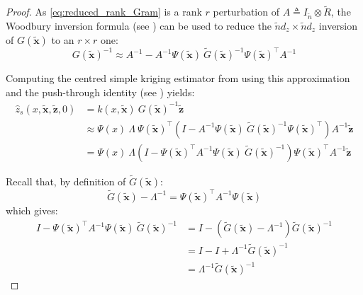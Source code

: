 \begin{proof}
	As \eqref{eq:reduced_rank_Gram} is a rank $r$ perturbation of $A\triangleq I_{\tilde{n}}\otimes\tilde{R}$, the Woodbury inversion formula (see ) can be used to reduce the $\tilde{n}d_z\times\tilde{n}d_z$ inversion of $G(\tilde{\mathbf{x}})$ to an $r\times r$ one:
	\begin{equation}
		G(\tilde{\mathbf{x}})^{-1}\approx A^{-1}-A^{-1}\Psi(\tilde{\mathbf{x}})\:\tilde{G}(\tilde{\mathbf{x}})^{-1}\Psi(\tilde{\mathbf{x}})^\top A^{-1}
	\end{equation}

	Computing the centred simple kriging estimator from  using this approximation and the push-through identity (see ) yields:
	\begin{equation}
		\begin{aligned}
		\hat{z}_s(x,\tilde{\mathbf{x}},\tilde{\mathbf{z}},0)&=k(x,\tilde{\mathbf{x}})\:G(\tilde{\mathbf{x}})^{-1}\tilde{\mathbf{z}}\\
		&\approx\Psi(x)\:\Lambda\:\Psi(\tilde{\mathbf{x}})^\top\left(I-A^{-1}\Psi(\tilde{\mathbf{x}})\:\tilde{G}(\tilde{\mathbf{x}})^{-1}\Psi(\tilde{\mathbf{x}})^\top\right)A^{-1}\tilde{\mathbf{z}}\\
		&=\Psi(x)\:\Lambda\left(I-\Psi(\tilde{\mathbf{x}})^\top A^{-1}\Psi(\tilde{\mathbf{x}})\:\tilde{G}(\tilde{\mathbf{x}})^{-1}\right)\Psi(\tilde{\mathbf{x}})^\top A^{-1}\tilde{\mathbf{z}}
		\end{aligned}\label{eq:z_s_up_to_tilde_G}
	\end{equation}

	Recall that, by definition of $\tilde{G}(\tilde{\mathbf{x}})$:
	\begin{equation}
		\tilde{G}(\tilde{\mathbf{x}})-\Lambda^{-1}=\Psi(\tilde{\mathbf{x}})^\top A^{-1}\Psi(\tilde{\mathbf{x}})
	\end{equation}
	which gives:
	\begin{equation}
		\begin{aligned}
		I-\Psi(\tilde{\mathbf{x}})^\top A^{-1}\Psi(\tilde{\mathbf{x}})\:\tilde{G}(\tilde{\mathbf{x}})^{-1}&=I-\left(\tilde{G}(\tilde{\mathbf{x}})-\Lambda^{-1}\right)\tilde{G}(\tilde{\mathbf{x}})^{-1}\\
		&=I-I+\Lambda^{-1}\tilde{G}(\tilde{\mathbf{x}})^{-1}\\
		&=\Lambda^{-1}\tilde{G}(\tilde{\mathbf{x}})^{-1}
		\end{aligned}\label{eq:reduced_rank_lemma}
	\end{equation}


\end{proof}
